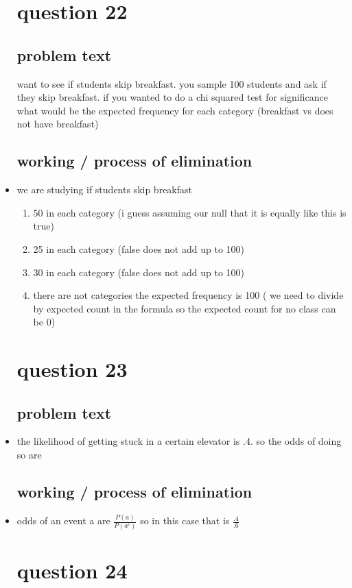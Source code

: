 \documentclass{article}
\begin{document}
\begin{itemize}
\section{question 22}
\subsection{problem text}
want to see if students skip breakfast. you sample 100 students and ask if they skip breakfast. if you wanted to do a chi squared test for significance what would be the expected frequency for each category (breakfast vs does not have breakfast) 
\subsection{working / process of elimination }
\item we are studying if students skip breakfast 
\begin{enumerate}
    \item 50 in each category (i guess assuming our null that it is equally like this is true) 
    \item 25 in each category (false does not add up to 100)
    \item 30 in each category (false does not add up to 100)  
    \item there are not categories the expected frequency is 100 ( we need to divide by expected count in the formula so the expected count for no class can be 0) 
\end{enumerate}
\section{question 23}
\subsection{problem text}
\item the likelihood of getting stuck in a certain elevator is .4. so the odds of doing so are 
\subsection{working / process of elimination }
\item odds of an event a are $\frac{P(a)}{P(a^c)}$ so in this case that is $\frac{.4}{.6}$

\section{question 24}

\end{itemize}
\end{document}
